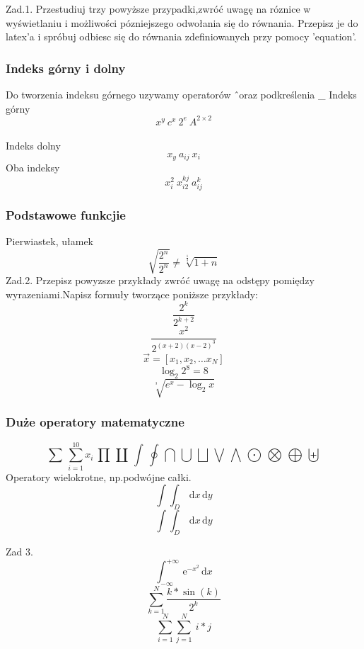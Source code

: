 \documentclass[a4paper,12pt]{article}
\begin{document}
Zad.1.
Przestudiuj trzy powyższe przypadki,zwróć uwagę na róznice w wyświetlaniu i możliwości pózniejszego odwołania się do równania. Przepisz je do latex'a i spróbuj odbiesc  się do równania zdefiniowanych przy pomocy 'equation'.
\subsubsection{Indeks górny i dolny} 

Do tworzenia indeksu górnego uzywamy operatorów \^ \ oraz podkreślenia \_ \newline
Indeks górny 
$$x^{y} \ c^{x}\  2^{e} \ A^{2 \times 2}$$\\
Indeks dolny
$$x_y \ a_{ij}\ x_{i} $$
Oba indeksy
$$x^{2}_{i}\ x^{kj}_{i2}\ a^{k}_{ij}$$

\subsubsection{Podstawowe funkcjie}
Pierwiastek, ułamek
$$\sqrt{\frac{2^{n}}{2^{n}}} \neq \sqrt [\frac{1}{3}]{1+n} $$
Zad.2.
Przepisz powyzsze przykłady zwróć uwagę na odstępy pomiędzy wyrazeniami.Napisz formuły tworzące poniższe przykłady:
$$\frac {2^{k}}{2^{k+2}} $$
$$\frac{x^2}{2^{(x+2)(x-2)^{3}}}$$\newline
$$\vec{x}=[x_1,x_2,\dots x_N]$$\newline
$$\log_{2}2^{8}=8$$\newline
$$\sqrt[^3]{e^x-\log_{2}x}$$

\subsubsection{Duże operatory matematyczne}
$$\sum \ \sum_{i=1}^{10}x_{i} \ \prod \ \coprod \ \int \ \oint \ \bigcap \ \bigcup
\ \bigsqcup \ \bigvee \ \bigwedge \ \bigodot \ \bigotimes \ \bigoplus \ \biguplus$$
\newline
Operatory wielokrotne, np.podwójne całki.\newline
$$\int\int_D\,\mathrm{d} x \,\mathrm{d} y$$\newline
$$\int\!\!\int_D\,\mathrm{d}x \,\mathrm{d}y$$

Zad 3.\newline\newline
\begin{equation}
\int^{+\infty}_{-\infty}\,\mathrm{e}^{-x^{2}}\,\mathrm{d}x 
\end{equation}
$$\sum^N_{k=1}\frac{k\ast\sin(k)}{2^k}$$
$$\sum^N_{i=1}\sum^N_{j=1}\ i\ast j$$
\end{document}
